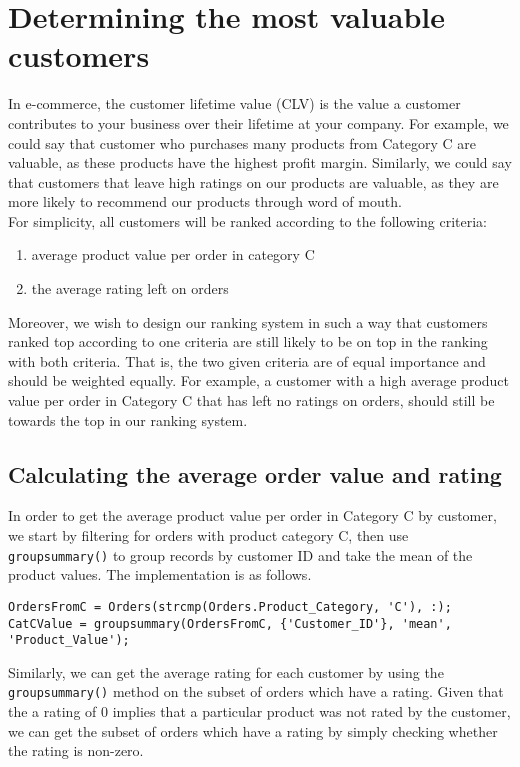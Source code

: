 \newpage
\section{Determining the most valuable customers}
In e-commerce, the customer lifetime value (CLV) is the value a customer contributes to your business over their lifetime at your company. For example, we could say that customer who purchases many products from Category C are valuable, as these products have the highest profit margin. Similarly, we could say that customers that leave high ratings on our products are valuable, as they are more likely to recommend our products through word of mouth. \\

\noindent
For simplicity, all customers will be ranked according to the following criteria:
\begin{enumerate}[label=(\arabic*)]
  \item average product value per order in category C
  \item the average rating left on orders
\end{enumerate}

\noindent
Moreover, we wish to design our ranking system in such a way that customers ranked top according to one criteria are still likely to be on top in the ranking with both criteria. That is, the two given criteria are of equal importance and should be weighted equally. For example, a customer with a high average product value per order in Category C that has left no ratings on orders, should still be towards the top in our ranking system.

\subsection{Calculating the average order value and rating}
In order to get the average product value per order in Category C by customer, we start by filtering for orders with product category C, then use \lstinline|groupsummary()| to group records by customer ID and take the mean of the product values. The implementation is as follows.

\begin{lstlisting}
OrdersFromC = Orders(strcmp(Orders.Product_Category, 'C'), :);
CatCValue = groupsummary(OrdersFromC, {'Customer_ID'}, 'mean', 'Product_Value');
\end{lstlisting}

\noindent
Similarly, we can get the average rating for each customer by using the \lstinline|groupsummary()| method on the subset of orders which have a rating. Given that the a rating of 0 implies that a particular product was not rated by the customer, we can get the subset of orders which have a rating by simply checking whether the rating is non-zero.

